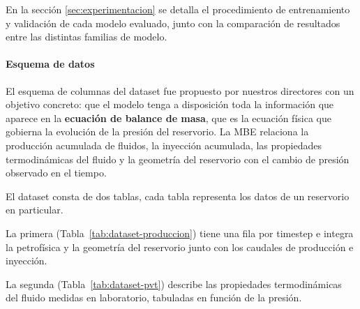 \documentclass[12pt,a4paper]{article}
\begin{document}
En la sección \ref{sec:experimentacion} se detalla el procedimiento de entrenamiento y
validación de cada modelo evaluado, junto con la comparación de resultados entre las
distintas familias de modelo.

\paragraph{Esquema de datos}

El esquema de columnas del dataset fue propuesto por nuestros directores con un objetivo concreto: que el modelo tenga 
a disposición toda la información que aparece en la \textbf{ecuación de balance de masa}, que es la 
ecuación física que gobierna la evolución de la presión del reservorio. La MBE relaciona la producción acumulada 
de fluidos, la inyección acumulada, las propiedades termodinámicas del fluido y la geometría del reservorio con el 
cambio de presión observado en el tiempo. 

El dataset consta de dos tablas, cada tabla representa los datos de un reservorio en particular.

La primera (Tabla~\ref{tab:dataset-produccion}) tiene una fila por timestep e integra la petrofísica
y la geometría del reservorio junto con los caudales de producción e inyección.

La segunda (Tabla~\ref{tab:dataset-pvt}) describe las propiedades termodinámicas 
del fluido medidas en laboratorio, tabuladas en función de la presión.
\end{document}
